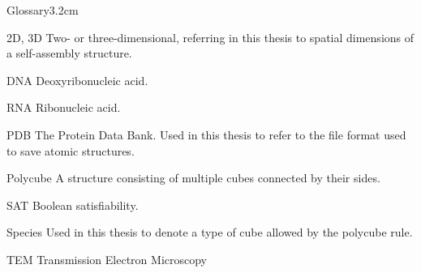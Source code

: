 \begin{mclistof}{Glossary}{3.2cm}

\item[2D, 3D] Two- or three-dimensional, referring in this thesis to spatial dimensions of a self-assembly structure.
\item[DNA] Deoxyribonucleic acid.
\item[RNA] Ribonucleic acid.
\item[PDB] The Protein Data Bank. Used in this thesis to refer to the file format used to save atomic structures.
\item[Polycube] A structure consisting of multiple cubes connected by their sides. 
\item[SAT] Boolean satisfiability.
\item[Species] Used in this thesis to denote a type of cube allowed by the polycube rule.
\item[TEM] Transmission Electron Microscopy 

\end{mclistof} 
